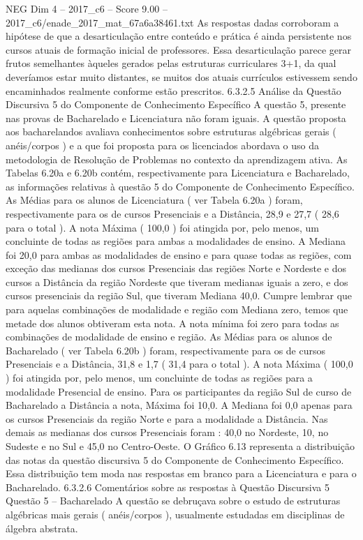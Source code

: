 \begin{textsample}{NEG Dim 4 – 2017\_c6 – Score 9.00 – 2017\_c6/enade\_2017\_mat\_67a6a38461.txt}
As respostas dadas corroboram a hipótese de que a desarticulação entre conteúdo e prática é ainda persistente nos cursos atuais de formação inicial de professores.
Essa desarticulação parece gerar frutos semelhantes àqueles gerados pelas estruturas curriculares 3+1, da qual deveríamos estar muito distantes, se muitos dos atuais currículos estivessem sendo encaminhados realmente conforme estão prescritos. 6.3.2.5 Análise da Questão Discursiva 5 do Componente de Conhecimento Específico A questão 5, presente nas provas de Bacharelado e Licenciatura não foram iguais.
A questão proposta aos bacharelandos avaliava conhecimentos sobre estruturas algébricas gerais ( anéis/corpos ) e a que foi proposta para os licenciados abordava o uso da metodologia de Resolução de Problemas no contexto da aprendizagem ativa.
As Tabelas 6.20a e 6.20b contém, respectivamente para Licenciatura e Bacharelado, as informações relativas à questão 5 do Componente de Conhecimento Específico.
As Médias para os alunos de Licenciatura ( ver Tabela 6.20a ) foram, respectivamente para os de cursos Presenciais e a Distância, 28,9 e 27,7 ( 28,6 para o total ).
A nota Máxima ( 100,0 ) foi atingida por, pelo menos, um concluinte de todas as regiões para ambas a modalidades de ensino.
A Mediana foi 20,0 para ambas as modalidades de ensino e para quase todas as regiões, com exceção das medianas dos cursos Presenciais das regiões Norte e Nordeste e dos cursos a Distância da região Nordeste que tiveram medianas iguais a zero, e dos cursos presenciais da região Sul, que tiveram Mediana 40,0.
Cumpre lembrar que para aquelas combinações de modalidade e região com Mediana zero, temos que metade dos alunos obtiveram esta nota.
A nota mínima foi zero para todas as combinações de modalidade de ensino e região.
As Médias para os alunos de Bacharelado ( ver Tabela 6.20b ) foram, respectivamente para os de cursos Presenciais e a Distância, 31,8 e 1,7 ( 31,4 para o total ).
A nota Máxima ( 100,0 ) foi atingida por, pelo menos, um concluinte de todas as regiões para a modalidade Presencial de ensino.
Para os participantes da região Sul de curso de Bacharelado a Distância a nota, Máxima foi 10,0.
A Mediana foi 0,0 apenas para os cursos Presenciais da região Norte e para a modalidade a Distância.
Nas demais as medianas dos cursos Presenciais foram : 40,0 no Nordeste, 10, no Sudeste e no Sul e 45,0 no Centro-Oeste.
O Gráfico 6.13 representa a distribuição das notas da questão discursiva 5 do Componente de Conhecimento Específico.
Essa distribuição tem moda nas respostas em branco para a Licenciatura e para o Bacharelado. 6.3.2.6 Comentários sobre as respostas à Questão Discursiva 5 Questão 5 – Bacharelado A questão se debruçava sobre o estudo de estruturas algébricas mais gerais ( anéis/corpos ), usualmente estudadas em disciplinas de álgebra abstrata.

\end{textsample}
